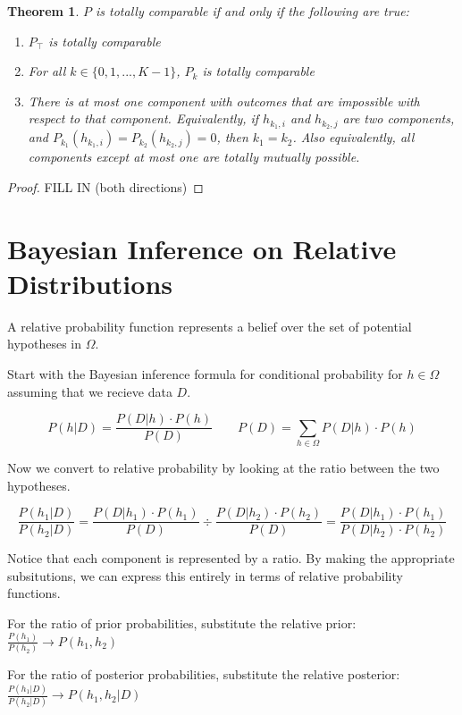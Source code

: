 \documentclass[twoside]{article}
\theoremstyle{plain}%
\newtheorem{theorem}{Theorem}[section]
\theoremstyle{definition}
\theoremstyle{remark}
\begin{document}
\begin{theorem}
\(P\) is totally comparable if and only if the following are true:

\begin{enumerate}
\item \(P_{\top}\) is totally comparable
\item For all \(k \in \{0, 1, ..., K - 1\}\), \(P_k\) is totally comparable
\item There is at most one component with outcomes that are impossible with respect to that component. Equivalently, if \(h_{k_1, i}\) and \(h_{k_2, j}\) are two components, and \(P_{k_1}(h_{k_1, i}) = P_{k_2}(h_{k_2, j}) = 0\), then \(k_1 = k_2\). Also equivalently, all components except at most one are totally mutually possible.
\end{enumerate}
\end{theorem}

\begin{proof}
FILL IN (both directions)
\end{proof}

\section{Bayesian Inference on Relative Distributions}

A relative probability function represents a belief over the set of potential hypotheses in \(\Omega\).

Start with the Bayesian inference formula for conditional probability for \(h \in \Omega\) assuming that we recieve data \(D\).

\[P(h|D) = \frac{P(D|h) \cdot P(h)}{P(D)} \qquad P(D) = \sum_{h \in \Omega} P(D|h) \cdot P(h)\]

Now we convert to relative probability by looking at the ratio between the two hypotheses.

\[\frac{P(h_1|D)}{P(h_2| D)} = \frac{P(D|h_1) \cdot P(h_1)}{P(D)} \div \frac{P(D|h_2) \cdot P(h_2)}{P(D)} = \frac{P(D|h_1) \cdot P(h_1)}{P(D|h_2) \cdot P(h_2)} \]

Notice that each component is represented by a ratio. By making the appropriate subsitutions, we can express this entirely in terms of relative probability functions.

For the ratio of prior probabilities, substitute the relative prior: \(\frac{P(h_1)}{P(h_2)} \rightarrow P(h_1, h_2) \)

For the ratio of posterior probabilities, substitute the relative posterior: \(\frac{P(h_1|D)}{P(h_2|D)} \rightarrow P(h_1, h_2|D) \)
\end{document}
